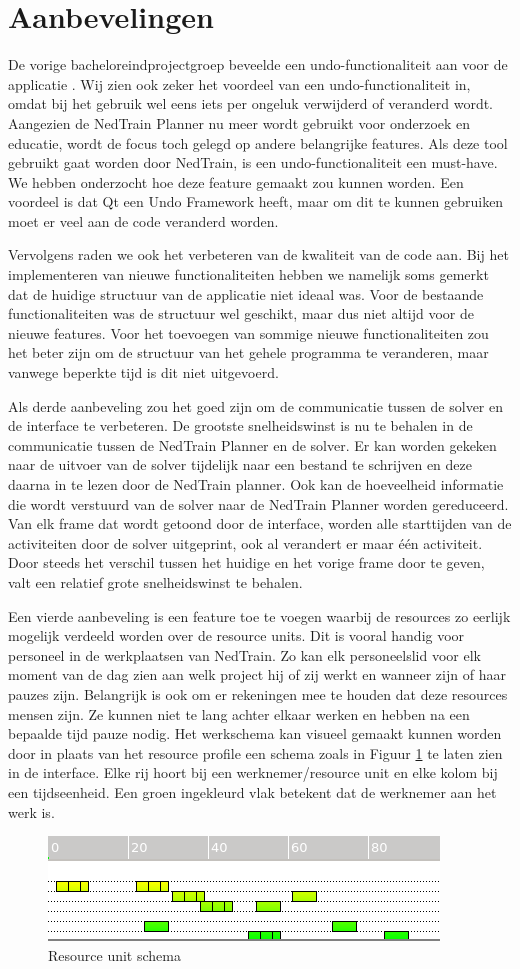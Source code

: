 \section{Aanbevelingen}
De vorige bacheloreindprojectgroep beveelde een undo-functionaliteit aan voor de applicatie \cite{bep2012nedtrain}. Wij zien ook zeker het voordeel van een undo-functionaliteit in, omdat bij het gebruik wel eens iets per ongeluk verwijderd of veranderd wordt. Aangezien de NedTrain Planner nu meer wordt gebruikt voor onderzoek en educatie, wordt de focus toch gelegd op andere belangrijke features. Als deze tool gebruikt gaat worden door NedTrain, is een undo-functionaliteit een must-have. We hebben onderzocht hoe deze feature gemaakt zou kunnen worden. Een voordeel is dat Qt een Undo Framework heeft, maar om dit te kunnen gebruiken moet er veel aan de code veranderd worden. 

Vervolgens raden we ook het verbeteren van de kwaliteit van de code aan. Bij het implementeren van nieuwe functionaliteiten hebben we namelijk soms gemerkt dat de huidige structuur van de applicatie niet ideaal was. Voor de bestaande functionaliteiten was de structuur wel geschikt, maar dus niet altijd voor de nieuwe features. Voor het toevoegen van sommige nieuwe functionaliteiten zou het beter zijn om de structuur van het gehele programma te veranderen, maar vanwege beperkte tijd is dit niet uitgevoerd.

Als derde aanbeveling zou het goed zijn om de communicatie tussen de solver en de interface te verbeteren. De grootste snelheidswinst is nu te behalen in de communicatie tussen de NedTrain Planner en de solver. Er kan worden gekeken naar de uitvoer van de solver tijdelijk naar een bestand te schrijven en deze daarna in te lezen door de NedTrain planner. Ook kan de hoeveelheid informatie die wordt verstuurd van de solver naar de NedTrain Planner worden gereduceerd. Van elk frame dat wordt getoond door de interface, worden alle starttijden van de activiteiten door de solver uitgeprint, ook al verandert er maar \'e\'en activiteit. Door steeds het verschil tussen het huidige en het vorige frame door te geven, valt een relatief grote snelheidswinst te behalen.

Een vierde aanbeveling is een feature toe te voegen waarbij de resources zo eerlijk mogelijk verdeeld worden over de resource units. Dit is vooral handig voor personeel in de werkplaatsen van NedTrain. Zo kan elk personeelslid voor elk moment van de dag zien aan welk project hij of zij werkt en wanneer zijn of haar pauzes zijn. Belangrijk is ook om er rekeningen mee te houden dat deze resources mensen zijn. Ze kunnen niet te lang achter elkaar werken en hebben na een bepaalde tijd pauze nodig. Het werkschema kan visueel gemaakt kunnen worden door in plaats van het resource profile een schema zoals in Figuur \ref{fig:schema} te laten zien in de interface. Elke rij hoort bij een werknemer/resource unit en elke kolom bij een tijdseenheid. Een groen ingekleurd vlak betekent dat de werknemer aan het werk is.

\begin{figure}[H]
\centering
\includegraphics[width=.5\textwidth]{../images/schedule.png}
\caption{Resource unit schema}
\label{fig:schema}
\end{figure}
